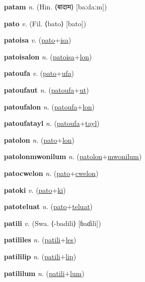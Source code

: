 \textbf{\hypertarget{patam}{patam}} \textit{n.} (Hin. ⟨{\devanagari{}बादाम}⟩ [baːdaːm])


\textbf{\hypertarget{pato}{pato}} \textit{v.} (Fil. ⟨bato⟩ [bato])


\textbf{\hypertarget{patoisa}{patoisa}} \textit{v.} (\hyperlink{pato}{pato}+\allowbreak \hyperlink{isa}{isa})


\textbf{\hypertarget{patoisalon}{patoisalon}} \textit{n.} (\hyperlink{patoisa}{patoisa}+\allowbreak \hyperlink{lon}{lon})


\textbf{\hypertarget{patoufa}{patoufa}} \textit{v.} (\hyperlink{pato}{pato}+\allowbreak \hyperlink{ufa}{ufa})


\textbf{\hypertarget{patoufaut}{patoufaut}} \textit{n.} (\hyperlink{patoufa}{patoufa}+\allowbreak \hyperlink{ut}{ut})


\textbf{\hypertarget{patoufalon}{patoufalon}} \textit{n.} (\hyperlink{patoufa}{patoufa}+\allowbreak \hyperlink{lon}{lon})


\textbf{\hypertarget{patoufatayl}{patoufatayl}} \textit{n.} (\hyperlink{patoufa}{patoufa}+\allowbreak \hyperlink{tayl}{tayl})


\textbf{\hypertarget{patolon}{patolon}} \textit{n.} (\hyperlink{pato}{pato}+\allowbreak \hyperlink{lon}{lon})


\textbf{\hypertarget{patolonmwonilum}{patolonmwonilum}} \textit{n.} (\hyperlink{patolon}{patolon}+\allowbreak \hyperlink{mwonilum}{mwonilum})


\textbf{\hypertarget{patocwelon}{patocwelon}} \textit{n.} (\hyperlink{pato}{pato}+\allowbreak \hyperlink{cwelon}{cwelon})


\textbf{\hypertarget{patoki}{patoki}} \textit{v.} (\hyperlink{pato}{pato}+\allowbreak \hyperlink{ki}{ki})


\textbf{\hypertarget{patoteluat}{patoteluat}} \textit{n.} (\hyperlink{pato}{pato}+\allowbreak \hyperlink{teluat}{teluat})


\textbf{\hypertarget{patili}{patili}} \textit{v.} (Swa. ⟨-badili⟩ [ɓaɗili])


\textbf{\hypertarget{patililes}{patililes}} \textit{n.} (\hyperlink{patili}{patili}+\allowbreak \hyperlink{les}{les})


\textbf{\hypertarget{patililip}{patililip}} \textit{n.} (\hyperlink{patili}{patili}+\allowbreak \hyperlink{lip}{lip})


\textbf{\hypertarget{patililum}{patililum}} \textit{n.} (\hyperlink{patili}{patili}+\allowbreak \hyperlink{lum}{lum})


